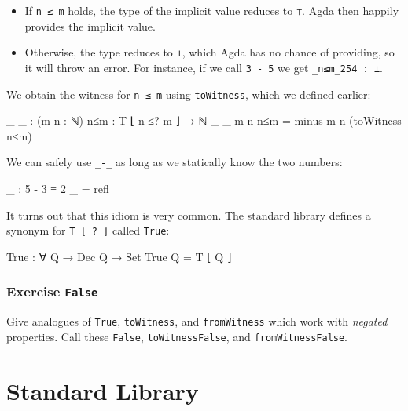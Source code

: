 \begin{itemize}
\tightlist
\item
  If \texttt{n\ ≤\ m} holds, the type of the implicit value reduces to
  \texttt{⊤}. Agda then happily provides the implicit value.
\item
  Otherwise, the type reduces to \texttt{⊥}, which Agda has no chance of
  providing, so it will throw an error. For instance, if we call
  \texttt{3\ -\ 5} we get \texttt{\_n≤m\_254\ :\ ⊥}.
\end{itemize}

We obtain the witness for \texttt{n\ ≤\ m} using \texttt{toWitness},
which we defined earlier:

\begin{fence}
\begin{code}
_-_ : (m n : ℕ) {n≤m : T ⌊ n ≤? m ⌋} → ℕ
_-_ m n {n≤m} = minus m n (toWitness n≤m)
\end{code}
\end{fence}

We can safely use \texttt{\_-\_} as long as we statically know the two
numbers:

\begin{fence}
\begin{code}
_ : 5 - 3 ≡ 2
_ = refl
\end{code}
\end{fence}

It turns out that this idiom is very common. The standard library
defines a synonym for \texttt{T\ ⌊\ ?\ ⌋} called \texttt{True}:

\begin{fence}
\begin{code}
True : ∀ {Q} → Dec Q → Set
True Q = T ⌊ Q ⌋
\end{code}
\end{fence}

\hypertarget{exercise-false}{%
\subsubsection{\texorpdfstring{Exercise
\texttt{False}}{Exercise False}}\label{exercise-false}}

Give analogues of \texttt{True}, \texttt{toWitness}, and
\texttt{fromWitness} which work with \emph{negated} properties. Call
these \texttt{False}, \texttt{toWitnessFalse}, and
\texttt{fromWitnessFalse}.

\hypertarget{standard-library}{%
\section{Standard Library}\label{standard-library}}

